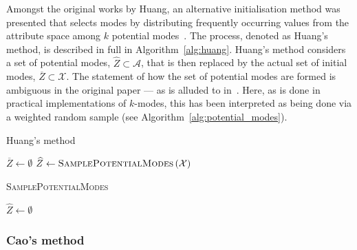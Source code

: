 \documentclass[11pt]{article}
\DeclarePairedDelimiter\abs{\lvert}{\rvert}%
\newcommand{\balg}{\begin{algorithm}[htbp]\DontPrintSemicolon}
\newcommand{\ealg}{\end{algorithm}}
\begin{document}
Amongst the original works by Huang, an alternative initialisation method was
presented that selects modes by distributing frequently occurring values from
the attribute space among \(k\) potential modes~\cite{Huang1998}. The process,
denoted as Huang's method, is described in full in Algorithm~\ref{alg:huang}.
Huang's method considers a set of potential modes, \(\widehat Z \subset \mathcal
A\), that is then replaced by the actual set of initial modes, \(\overline Z
\subset \mathcal X\). The statement of how the set of potential modes are formed
is ambiguous in the original paper --- as is alluded to in~\cite{Jiang2016}.
Here, as is done in practical implementations of \(k\)-modes, this has been
interpreted as being done via a weighted random sample (see
Algorithm~\ref{alg:potential_modes}).

\balg%
    \caption{Huang's method}\label{alg:huang}

    \(\overline Z \gets \emptyset\)\;
    \(\widehat Z \gets \textsc{SamplePotentialModes}\left(\mathcal{X}\right)\)\;

\ealg%

\balg%
    \caption{\textsc{SamplePotentialModes}}\label{alg:potential_modes}

    \(\widehat Z \gets \emptyset\)\;

\ealg%



\subsubsection{Cao's method}\label{subsec:cao}
\end{document}
